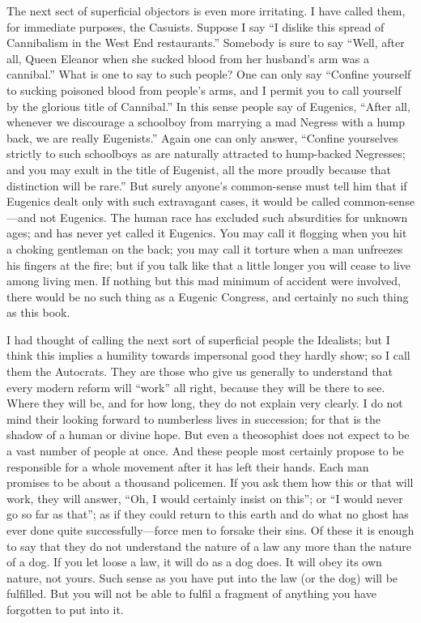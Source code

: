 \documentclass{book}
\begin{document}
The next sect of superficial objectors is even more irritating. I have called them, for immediate purposes, the Casuists. Suppose I say “I dislike this spread of Cannibalism in the West End restaurants.” Somebody is sure to say “Well, after all, Queen Eleanor when she sucked blood from her husband’s arm was a cannibal.” What is one to say to such people? One can only say “Confine yourself to sucking poisoned blood from people’s arms, and I permit you to call yourself by the glorious title of Cannibal.” In this sense people say of Eugenics, “After all, whenever we discourage a schoolboy from marrying a mad Negress with a hump back, we are really Eugenists.” Again one can only answer, “Confine yourselves strictly to such schoolboys as are naturally attracted to hump-backed Negresses; and you may exult in the title of Eugenist, all the more proudly because that distinction will be rare.” But surely anyone’s common-sense must tell him that if Eugenics dealt only with such extravagant cases, it would be called common-sense—and not Eugenics. The human race has excluded such absurdities for unknown ages; and has never yet called it Eugenics. You may call it flogging when you hit a choking gentleman on the back; you may call it torture when a man unfreezes his fingers at the fire; but if you talk like that a little longer you will cease to live among living men. If nothing but this mad minimum of accident were involved, there would be no such thing as a Eugenic Congress, and certainly no such thing as this book.

I had thought of calling the next sort of superficial people the Idealists; but I think this implies a humility towards impersonal good they hardly show; so I call them the Autocrats. They are those who give us generally to understand that every modern reform will “work” all right, because they will be there to see. Where they will be, and for how long, they do not explain very clearly. I do not mind their looking forward to numberless lives in succession; for that is the shadow of a human or divine hope. But even a theosophist does not expect to be a vast number of people at once. And these people most certainly propose to be responsible for a whole movement after it has left their hands. Each man promises to be about a thousand policemen. If you ask them how this or that will work, they will answer, “Oh, I would certainly insist on this”; or “I would never go so far as that”; as if they could return to this earth and do what no ghost has ever done quite successfully—force men to forsake their sins. Of these it is enough to say that they do not understand the nature of a law any more than the nature of a dog. If you let loose a law, it will do as a dog does. It will obey its own nature, not yours. Such sense as you have put into the law (or the dog) will be fulfilled. But you will not be able to fulfil a fragment of anything you have forgotten to put into it.
\end{document}
